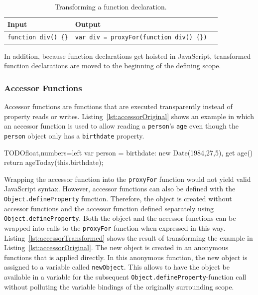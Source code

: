\begin{table}[h]
\begin{center}
\begin{tabular}{| l | l | l |}
\hline
Input & Output \\ \hline
\lstinline|function div() {}| & \lstinline|var div = proxyFor(function div() {})| \\ \hline
\end{tabular}
\end{center}
\caption[Table caption text]{Transforming a function declaration.}
\label{table:funcTransform}
\end{table}

In addition, because function declarations get hoisted in JavaScript, transformed function declarations are moved to the beginning of the defining scope.


\subsubsection{Accessor Functions}

Accessor functions are functions that are executed transparently instead of property reads or writes.
Listing~\ref{lst:accessorOriginal} shows an example in which an accessor function is used to allow reading a \lstinline{person}'s \lstinline{age} even though the \lstinline{person} object only has a \lstinline{birthdate} property.

\begin{code}{TODO}{float,numbers=left}
var person = {
    birthdate: new Date(1984,27,5),
    get age() {
        return ageToday(this.birthdate);
    }
}
\end{code}
\iffalse
\end{verbatim}\fi

Wrapping the accessor function into the \lstinline{proxyFor} function would not yield valid JavaScript syntax.
However, accessor functions can also be defined with the \lstinline{Object.defineProperty} function.
Therefore, the object is created without accessor functions and the accessor function defined separately using \lstinline{Object.defineProperty}.
Both the object and the accessor functions can be wrapped into calls to the \lstinline{proxyFor} function when expressed in this way.
Listing~\ref{lst:accessorTransformed} shows the result of transforming the example in Listing~\ref{lst:accessorOriginal}.
The new object is created in an anonymous functions that is applied directly.
In this anonymous function, the new object is assigned to a variable called \lstinline{newObject}.
This allows to have the object be available in a variable for the subsequent \lstinline{Object.defineProperty}-function call without polluting the variable bindings of the originally surrounding scope.

